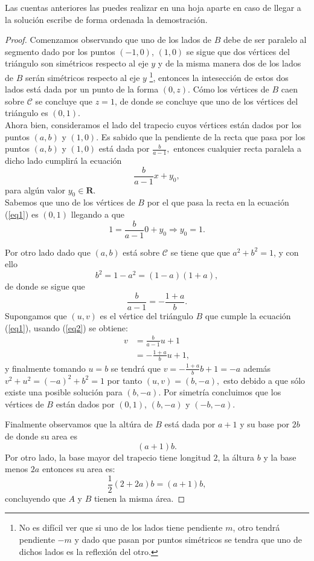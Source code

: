 \documentclass[a4paper,openright,10pt]{book}
\numberwithin{equation}{section}
\theoremstyle{definition}
\theoremstyle{definition}
\begin{document}
\begin{itemize}
\begin{enumerate}[a)]
Las cuentas anteriores las puedes realizar en una hoja aparte en caso de llegar a la solución escribe de forma ordenada la demostración.

\end{enumerate}

\begin{proof} Comenzamos observando que uno de los lados de $B$ debe de ser paralelo al segmento dado por los puntos $(-1,0)$, $(1,0)$ se sigue que dos vértices del triángulo son simétricos respecto al eje $y$ y de la misma manera dos de los lados de $B$ serán simétricos respecto al eje $y$ \footnote{No es difícil ver que si uno de los lados tiene pendiente $m$, otro tendrá pendiente $-m$ y dado que pasan por puntos simétricos se tendra que uno de dichos lados es la reflexión del otro.}, entonces la intesección de estos dos lados está dada por un punto de la forma $(0,z)$. Cómo los vértices de $B$ caen sobre $\mathcal{C}$ se concluye que $z=1$, de donde se concluye que uno de los vértices del triángulo es $(0,1).$\\

Ahora bien, consideramos el lado del trapecio cuyos vértices están dados por los puntos $(a,b)$ y $(1,0)$. Es sabido que la pendiente de la recta que pasa por los puntos $(a,b)$ y $(1,0)$ está dada por    $ \frac{b}{a-1}, $ 
entonces cualquier recta paralela a dicho lado cumplirá la ecuación 
\begin{equation}\label{eq1}
 \frac{b}{a-1}x+y_0,
\end{equation}
para algún valor $y_0 \in \mathbf{R}$. \\
Sabemos que uno de los vértices de $B$ por el que pasa la recta en la ecuación (\ref{eq1}) es $(0,1)$ llegando a que 
$$1=\frac{b}{a-1}0+y_0 \Rightarrow y_0=1.$$

Por otro lado dado que $(a,b)$ está sobre $\mathcal{C}$ se tiene que que $a^2+ b^2=1$, y con ello 
$$ b^2 = 1-a^2=(1-a)(1+a),$$ 
de donde se sigue que
\begin{equation}\label{eq2}
 \frac{b}{a-1}= -\frac{1+a}{b}.
\end{equation}
Supongamos que $(u,v)$ es el vértice del triángulo $B$ que cumple la ecuación (\ref{eq1}), usando (\ref{eq2}) se obtiene:
\begin{align*}
v&=  \frac{b}{a-1}u+1\\
&= -\frac{1+a}{b} u + 1,
\end{align*}
y finalmente tomando $u=b$ se tendrá que $v=-\frac{1+a}{b}b+1=-a$ además $v^2+u^2=(-a)^2+b^2=1$ por tanto $(u,v)=(b,-a),$ esto debido a que sólo existe una posible solución para $(b,-a).$ Por simetría concluimos que los vértices de $B$ están dados por $(0,1)$, $(b,-a)$ y $(-b,-a).$ 

Finalmente observamos que la altúra de $B$ está dada por $a+1$ y su base por $2b$ de donde su area es $$(a+1)b.$$
Por otro lado, la base mayor del trapecio tiene longitud $2$, la áltura $b$ y la base menos $2a$ entonces su area es:
$$\frac{1}{2}(2+2a)b=(a+1)b,$$
concluyendo que $A$ y $B$ tienen la misma área.
\end{proof} 




\end{itemize}
\end{document}
